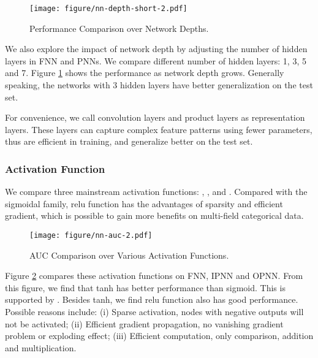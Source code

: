 \documentclass[conference]{IEEEtran}
\begin{document}
\begin{figure}[t]
	\centering
	\texttt{[image: figure/nn-depth-short-2.pdf]}
	\caption{Performance Comparison over Network Depths.}\label{fig:depth}
\end{figure}

We also explore the impact of network depth by adjusting the number of hidden layers in FNN and PNNs.
We compare different number of hidden layers: 1, 3, 5 and 7. Figure \ref{fig:depth} shows the performance as network depth grows. Generally speaking, the networks with 3 hidden layers have better generalization on the test set.


For convenience, we call convolution layers and product layers as representation layers.
These layers can capture complex feature patterns using fewer parameters, thus are efficient in training, and generalize better on the test set.



\subsubsection{Activation Function}
We compare three mainstream activation functions: , , and .
Compared with the sigmoidal family, relu function has the advantages of sparsity and efficient gradient, which is possible to gain more benefits on multi-field categorical data.


\begin{figure}[t]
	\centering
	\texttt{[image: figure/nn-auc-2.pdf]}
	\caption{AUC Comparison over Various Activation Functions.}\label{fig:act}
\end{figure}

Figure \ref{fig:act} compares these activation functions on FNN, IPNN and OPNN. From this figure, we find that tanh has better performance than sigmoid. This is supported by \cite{zhang2016deep}.
Besides tanh, we find relu function also has good performance. Possible reasons include: (i) Sparse activation, nodes with negative outputs will not be activated; (ii) Efficient gradient propagation, no vanishing gradient problem or exploding effect; (iii) Efficient computation, only comparison, addition and multiplication.
\end{document}
